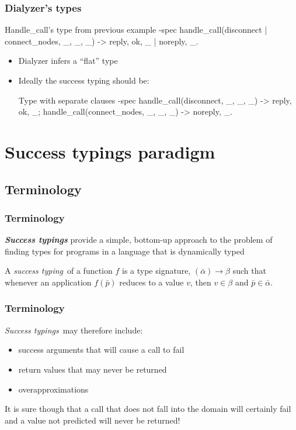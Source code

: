 \documentclass{beamer}
\newcommand{\st}{\emph{success typing}}
\newcommand{\Sts}{\emph{Success typings}}
\begin{document}
\begin{frame}[fragile]
  \frametitle{Dialyzer's types}
\begin{code}{Handle\_call's type from previous example}
  -spec handle_call({disconnect | connect_nodes, _},
                    _, _) ->
    {reply, ok, _} | {noreply, _}.
\end{code}
  \begin{itemize}
    \item Dialyzer infers a ``flat'' type \pause      
    \item Ideally the success typing should be:
\begin{code}{Type with separate clauses}
  -spec handle_call({disconnect, _}, _, _)
                       -> {reply, ok, _};
        handle_call({connect_nodes, _}, _, _)
                       -> {noreply, _}.
\end{code}
  \end{itemize}
\end{frame}

\section{Success typings paradigm}

\subsection{Terminology}

\begin{frame}
  \frametitle{Terminology}

  \textbf{\Sts}\cite{success_typings} provide a simple, bottom-up
  approach to the problem of finding types for programs in a language
  that is dynamically typed

  \begin{definition}
    A \st\ of a function $f$ is a type signature, $(\bar{\alpha})
    \rightarrow \beta$ such that whenever an application $f(\bar{p})$
    reduces to a value $v$, then $v \in \beta$ and $\bar{p} \in
    \bar{\alpha}$.
  \end{definition}

\end{frame}

\begin{frame}
  \frametitle{Terminology}
  \Sts\ may therefore include:
  \begin{itemize}
  \item success arguments that will cause a call to fail
  \item return values that may never be returned
  \item overapproximations
  \end{itemize} \pause
  It is sure though that a call that does not fall into the domain
  will certainly fail and a value not predicted will never be
  returned!
\end{frame}
\end{document}
